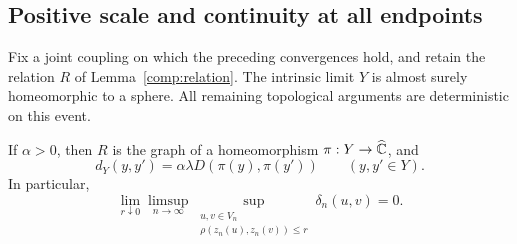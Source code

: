 \subsection{Positive scale and continuity at all endpoints}

Fix a joint coupling on which the preceding convergences hold, and
retain the relation $R$ of Lemma~\ref{comp:relation}.  The intrinsic
limit $Y$ is almost surely homeomorphic to a sphere.  All remaining
topological arguments are deterministic on this event.

\begin{proposition}
\label{comp:positive-fibers}
If $\alpha>0$, then $R$ is the graph of a homeomorphism
$\pi:Y\to\widehat{\mathbb C}$, and
\begin{equation}
 \label{comp:proportionality}
 d_Y(y,y')=\alpha\lambda D(\pi(y),\pi(y'))
 \qquad(y,y'\in Y).
\end{equation}
In particular,
\begin{equation}
 \label{comp:endpoint-modulus}
 \lim_{r\downarrow0}\limsup_{n\to\infty}
 \sup_{\substack{u,v\in V_n\\\rho(z_n(u),z_n(v))\le r}}
 \delta_n(u,v)=0.
\end{equation}
\end{proposition}

